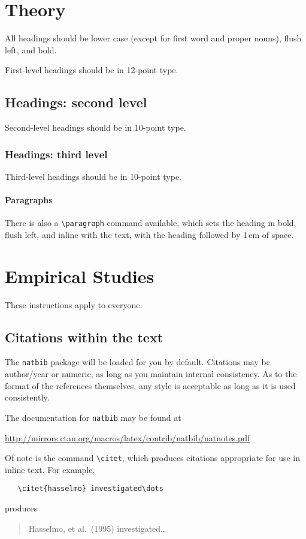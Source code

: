 \documentclass{article}
\begin{document}
\section{Theory}
\label{headings}

All headings should be lower case (except for first word and proper
nouns), flush left, and bold.

First-level headings should be in 12-point type.

\subsection{Headings: second level}

Second-level headings should be in 10-point type.

\subsubsection{Headings: third level}

Third-level headings should be in 10-point type.

\paragraph{Paragraphs}

There is also a \verb+\paragraph+ command available, which sets the
heading in bold, flush left, and inline with the text, with the
heading followed by 1\,em of space.

\section{Empirical Studies}
\label{others}

These instructions apply to everyone.

\subsection{Citations within the text}

The \verb+natbib+ package will be loaded for you by default.
Citations may be author/year or numeric, as long as you maintain
internal consistency.  As to the format of the references themselves,
any style is acceptable as long as it is used consistently.

The documentation for \verb+natbib+ may be found at
\begin{center}
  \url{http://mirrors.ctan.org/macros/latex/contrib/natbib/natnotes.pdf}
\end{center}
Of note is the command \verb+\citet+, which produces citations
appropriate for use in inline text.  For example,
\begin{verbatim}
   \citet{hasselmo} investigated\dots
\end{verbatim}
produces
\begin{quote}
  Hasselmo, et al.\ (1995) investigated\dots
\end{quote}
\end{document}
